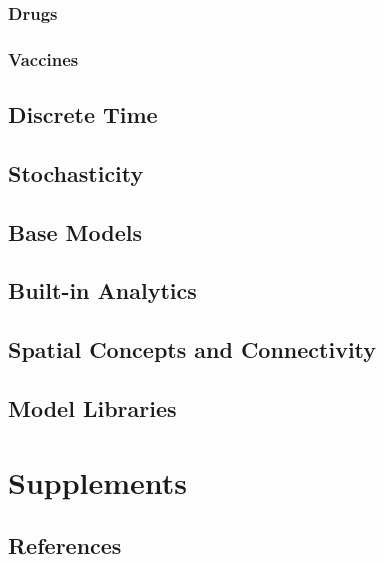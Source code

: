 \documentclass[
]{book}
\begin{document}
\hypertarget{drugs-1}{%
\section{Drugs}\label{drugs-1}}

\hypertarget{vaccines-1}{%
\section{Vaccines}\label{vaccines-1}}

\hypertarget{discrete-time}{%
\chapter{Discrete Time}\label{discrete-time}}

\hypertarget{stochasticity}{%
\chapter{Stochasticity}\label{stochasticity}}

\hypertarget{base-models}{%
\chapter{Base Models}\label{base-models}}

\hypertarget{built-in-analytics}{%
\chapter{Built-in Analytics}\label{built-in-analytics}}

\hypertarget{spatial-concepts-and-connectivity}{%
\chapter{Spatial Concepts and Connectivity}\label{spatial-concepts-and-connectivity}}

\hypertarget{model-libraries}{%
\chapter{Model Libraries}\label{model-libraries}}

\hypertarget{part-supplements}{%
\part{Supplements}\label{part-supplements}}

\hypertarget{references}{%
\chapter{References}\label{references}}
\end{document}
